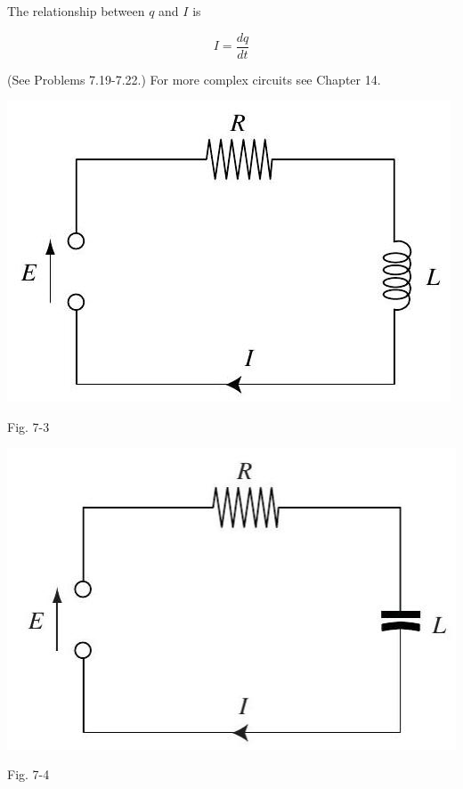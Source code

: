 \documentclass[10pt]{article}
\begin{document}
The relationship between $q$ and $I$ is


\begin{equation*}
I=\frac{d q}{d t} \tag{7.11}
\end{equation*}


(See Problems 7.19-7.22.) For more complex circuits see Chapter 14.

\begin{center}
\includegraphics[max width=\textwidth]{2024_04_03_5bb5b4275a64cb9887d1g-071(1)}
\end{center}

Fig. 7-3

\begin{center}
\includegraphics[max width=\textwidth]{2024_04_03_5bb5b4275a64cb9887d1g-071}
\end{center}

Fig. 7-4
\end{document}
